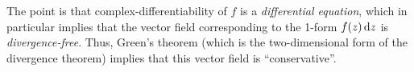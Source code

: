 \documentclass[12pt]{amsart}
\begin{document}
The point is that complex-differentiability of $f$ is a \emph{differential equation}, which in particular implies that the vector field corresponding to the 1-form $f(z)\,{\mathrm{d} z}$ is \emph{divergence-free}.
Thus, Green's theorem (which is the two-dimensional form of the divergence theorem) implies that this vector field is ``conservative''.
\end{document}
